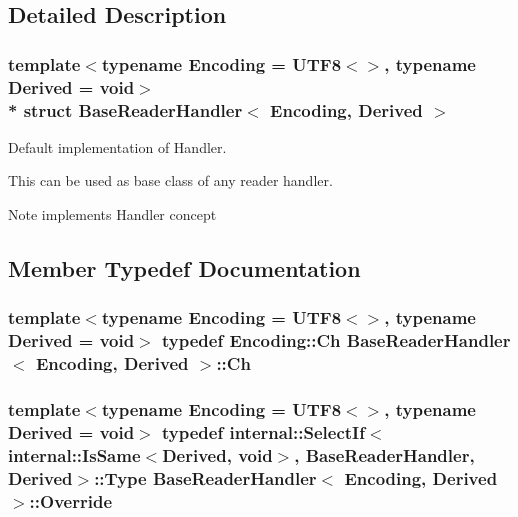 \subsection{Detailed Description}
\subsubsection*{template$<$typename Encoding = U\+T\+F8$<$$>$, typename Derived = void$>$\\*
struct Base\+Reader\+Handler$<$ Encoding, Derived $>$}

Default implementation of Handler. 

This can be used as base class of any reader handler. \begin{DoxyNote}{Note}
implements Handler concept 
\end{DoxyNote}


\subsection{Member Typedef Documentation}
\subsubsection[{\texorpdfstring{Ch}{Ch}}]{\setlength{\rightskip}{0pt plus 5cm}template$<$typename Encoding  = U\+T\+F8$<$$>$, typename Derived  = void$>$ typedef Encoding\+::\+Ch {\bf Base\+Reader\+Handler}$<$ Encoding, Derived $>$\+::{\bf Ch}}\hypertarget{structBaseReaderHandler_a8302c755dd3560c8c5bac99162c28214}{}\label{structBaseReaderHandler_a8302c755dd3560c8c5bac99162c28214}
\subsubsection[{\texorpdfstring{Override}{Override}}]{\setlength{\rightskip}{0pt plus 5cm}template$<$typename Encoding  = U\+T\+F8$<$$>$, typename Derived  = void$>$ typedef internal\+::\+Select\+If$<$internal\+::\+Is\+Same$<$Derived, void$>$, {\bf Base\+Reader\+Handler}, Derived$>$\+::{\bf Type} {\bf Base\+Reader\+Handler}$<$ Encoding, Derived $>$\+::{\bf Override}}\hypertarget{structBaseReaderHandler_a7b6c70d9bf7483b2de5d249f1593776a}{}\label{structBaseReaderHandler_a7b6c70d9bf7483b2de5d249f1593776a}


